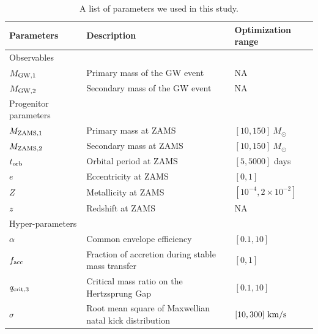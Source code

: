 \documentclass[twocolumn]{aastex631}
\begin{document}
\begin{table}[hbt!]
    \begin{center}
    \begin{tabular}{ l l l }
    \hline
    \hline
    Parameters &  Description & Optimization range\\
    \hline
    \hline
    Observables &\ &\  \\
    \hline
    \hline
    $M_{\rm GW,1}$ & Primary mass of the GW event & NA \\
    $M_{\rm GW,2}$ & Secondary mass of the GW event  & NA\\
    \hline
    \hline
    Progenitor parameters &\ &\  \\
    \hline
    \hline
    $M_{\rm ZAMS,1}$ & Primary mass at ZAMS & $[10,150]\ M_{\odot}$\\
    $M_{\rm ZAMS,2}$ & Secondary mass at ZAMS & $[10,150]\ M_{\odot}$\\
    $t_{\rm orb}$ & Orbital period at ZAMS & $[5,5000]$ days\\
    $e$ & Eccentricity at ZAMS & $[0,1]$\\
    $Z$ & Metallicity at ZAMS & $[10^{-4},2\times10^{-2}]$\\
    $z$ & Redshift at ZAMS & NA\\
    \hline
    \hline
    Hyper-parameters &\ &\ \\
    \hline
    \hline
    
    $\alpha$ & Common envelope efficiency & $[0.1,10]$\\
    $f_{\rm acc}$ & Fraction of accretion during stable mass transfer & $[0,1]$\\
    $q_{\rm crit,3}$ & Critical mass ratio on the Hertzsprung Gap & $[0.1,10]$\\
    $\sigma$ & Root mean square of Maxwellian natal kick distribution& $[10,300]\ {\rm km/s}$\\


    \hline
    \hline
    \end{tabular}
    \caption{A list of parameters we used in this study.}
    \label{tab:parameters}
    \end{center}
\end{table}
\end{document}
